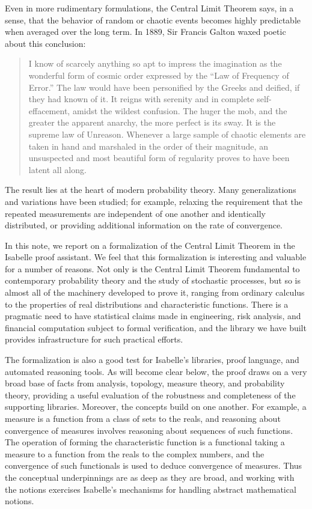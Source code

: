 \documentclass{article}
\begin{document}
Even in more rudimentary formulations, the Central Limit Theorem says, in a sense, that the behavior of random or chaotic events becomes highly predictable when averaged over the long term. In 1889, Sir Francis Galton waxed poetic about this conclusion:
\begin{quote}
 I know of scarcely anything so apt to impress the imagination as the wonderful form of cosmic order expressed by the ``Law of Frequency of Error.'' The law would have been personified by the Greeks and deified, if they had known of it. It reigns with serenity and in complete self-effacement, amidst the wildest confusion. The huger the mob, and the greater the apparent anarchy, the more perfect is its sway. It is the supreme law of Unreason. Whenever a large sample of chaotic elements are taken in hand and marshaled in the order of their magnitude, an unsuspected and most beautiful form of regularity proves to have been latent all along. \cite[page 66]{galton:89}
\end{quote}
The result lies at the heart of modern probability theory. Many generalizations and variations have been studied; for example, relaxing the requirement that the repeated measurements are independent of one another and identically distributed, or providing additional information on the rate of convergence.

In this note, we report on a formalization of the Central Limit Theorem in the Isabelle proof assistant. We feel that this formalization is interesting and valuable for a number of reasons. Not only is the Central Limit Theorem fundamental to contemporary probability theory and the study of stochastic processes, but so is almost all of the machinery developed to prove it, ranging from ordinary calculus to the properties of real distributions and characteristic functions. There is a pragmatic need to have statistical claims made in engineering, risk analysis, and financial computation subject to formal verification, and the library we have built provides infrastructure for such practical efforts.

The formalization is also a good test for Isabelle's libraries, proof language, and automated reasoning tools. As will become clear below, the proof draws on a very broad base of facts from analysis, topology, measure theory, and probability theory, providing a useful evaluation of the robustness and completeness of the supporting libraries. Moreover, the concepts build on one another. For example, a measure is a function from a class of sets to the reals, and reasoning about convergence of measures involves reasoning about sequences of such functions. The operation of forming the characteristic function is a functional taking a measure to a function from the reals to the complex numbers, and the convergence of such functionals is used to deduce convergence of measures. Thus the conceptual underpinnings are as deep as they are broad, and working with the notions exercises Isabelle's mechanisms for handling abstract mathematical notions.
\end{document}
